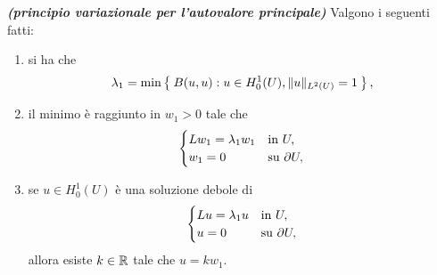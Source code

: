 \begin{teorema}\textbf{\emph{(principio variazionale per l'autovalore principale)}}
	Valgono i seguenti fatti:
	\begin{enumerate}[$(a)$]
		\item si ha che
		\[ \lambda_1 = \min \Set{B(u,u): u \in H^1_0(U), \lVert u\rVert_{L^2(U)}=1}, \]
		\item il minimo è raggiunto in $w_1>0$ tale che 
		\[ \begin{cases}
			Lw_1 = \lambda_1 w_1 & \textup{in } U,\\
			w_1 = 0 & \textup{su } \partial U,
		\end{cases} \]
		\item se $u \in H^1_0(U)$ è una soluzione debole di 
		\[ \begin{cases}
			Lu = \lambda_1 u & \textup{in } U,\\
			u = 0 & \textup{su } \partial U,
		\end{cases} \]
		allora esiste $k \in \mathbb{R}$ tale che $u = k w_1$.
	\end{enumerate}
\end{teorema}
